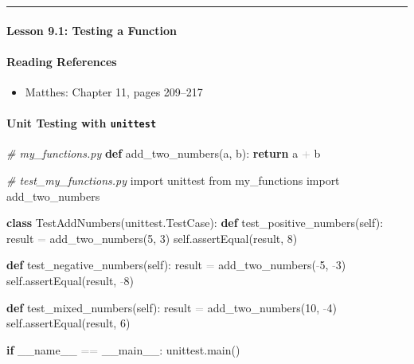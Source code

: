 \documentclass[
  justified,
  openright,
]{tufte-book}
\let\subsection\paragraph
\let\paragraph\paragraph
\newcommand{\KeywordTok}[1]{\textcolor{CodeKeyword}{\textbf{#1}}}  %
\newcommand{\StringTok}[1]{\textcolor{CodeString}{#1}}              %
\newcommand{\CommentTok}[1]{\textcolor{CodeComment}{\textit{#1}}}  %
\newcommand{\CodeNumTok}[1]{\textcolor{CodeNumber}{#1}}             %
\newcommand{\CodeAccentTok}[1]{\textcolor{CodeAccent}{#1}}          %
\newcommand{\OperatorTok}[1]{\textcolor{DarkGray}{#1}}              %
\newenvironment{Shaded}{%
  \begin{mdframed}[style=TufteCode]%
}{%
  \end{mdframed}%
}
\let\subsection\paragraph
\let\paragraph\paragraph
\providecommand{\tightlist}{%
  \setlength{\itemsep}{0pt}\setlength{\parskip}{0pt}}
\begin{document}
\begin{center}\rule{0.5\linewidth}{0.5pt}\end{center}

\subsection{Lesson 9.1: Testing a
Function}\label{lesson-9.1-testing-a-function}

\subsection{Reading References}\label{reading-references-27}

\begin{itemize}
\tightlist
\item
  Matthes: Chapter 11, pages 209--217
\end{itemize}

\subsection{\texorpdfstring{Unit Testing with
\texttt{unittest}}{Unit Testing with unittest}}\label{unit-testing-with-unittest}

\begin{Shaded}
\begin{Highlighting}[]
\CommentTok{\# my\_functions.py}
\KeywordTok{def} add\_two\_numbers(a, b):
    \KeywordTok{return} a \OperatorTok{+} b
\end{Highlighting}
\end{Shaded}

\begin{Shaded}
\begin{Highlighting}[]
\CommentTok{\# test\_my\_functions.py}
\CodeAccentTok{import} unittest
\CodeAccentTok{from} my\_functions \CodeAccentTok{import} add\_two\_numbers
 
\KeywordTok{class} TestAddNumbers(unittest.TestCase):
    \KeywordTok{def} test\_positive\_numbers(self):
        result \OperatorTok{=} add\_two\_numbers(\CodeNumTok{5}, \CodeNumTok{3})
        self.assertEqual(result, \CodeNumTok{8})
 
    \KeywordTok{def} test\_negative\_numbers(self):
        result \OperatorTok{=} add\_two\_numbers(\OperatorTok{{-}}\CodeNumTok{5}, \OperatorTok{{-}}\CodeNumTok{3})
        self.assertEqual(result, \OperatorTok{{-}}\CodeNumTok{8})
 
    \KeywordTok{def} test\_mixed\_numbers(self):
        result \OperatorTok{=} add\_two\_numbers(\CodeNumTok{10}, \OperatorTok{{-}}\CodeNumTok{4})
        self.assertEqual(result, \CodeNumTok{6})
 
\KeywordTok{if} \_\_name\_\_ \OperatorTok{==} \StringTok{\textquotesingle{}\_\_main\_\_\textquotesingle{}}:
    unittest.main()
\end{Highlighting}
\end{Shaded}
\end{document}
